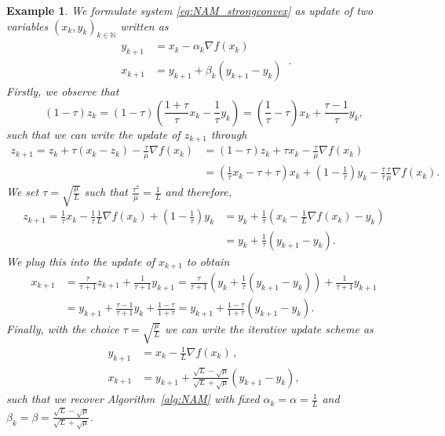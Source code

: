\documentclass[12pt,openany]{book}
\newtheorem{example}[thm]{Example}
\theoremstyle{definition}
\theoremstyle{definition}
\newcommand{\N}{\mathbb{N}}
\begin{document}
\begin{example}
We formulate system \eqref{eq:NAM_strongconvex} as update of two variables $(x_k,y_k)_{k\in\N}$ written as
\begin{equation*}
\begin{split}
y_{k+1} &= x_k - \alpha_k\nabla f(x_k)\\
x_{k+1} &= y_{k+1} + \beta_k (y_{k+1}-y_k)
\end{split}\, .
\end{equation*}
Firstly, we observe that
\[(1-\tau) z_k = (1-\tau)\left(\frac{1+\tau}{\tau} x_k -\frac{1}{\tau} y_k \right) = \left(\frac{1}{\tau}-\tau\right) x_k + \frac{\tau-1}{\tau}y_k, \]
such that we can write the update of $z_{k+1}$ through
\begin{align*}
z_{k+1} = z_k + \tau (x_k-z_k) - \frac{\tau}{\mu} \nabla f(x_k)
&=(1-\tau) z_k + \tau x_k-\frac{\tau}{\mu} \nabla f(x_k)\\
&=\left(\frac{1}{\tau} x_k -\tau+\tau\right) x_k +\left(1-\frac{1}{\tau}\right)y_k - \frac{\tau}{\tau}\frac{\tau}{\mu}\nabla f(x_k).
\end{align*}
We set $\tau = \sqrt{\frac{\mu}{L}}$ such that $\frac{\tau^2}{\mu} = \frac{1}L$ and therefore,
\begin{align*}
z_{k+1} = \frac1\tau x_k - \frac1\tau \frac1L\nabla f(x_k) + \left(1-\frac1\tau\right)y_k &= y_k + \frac1\tau \left(x_k-\frac1L\nabla f(x_k) -y_k \right)\\
&= y_k + \frac1\tau (y_{k+1}-y_k).
\end{align*}
We plug this into the update of $x_{k+1}$ to obtain
\begin{align*}
x_{k+1} &= \frac{\tau}{\tau+1}z_{k+1} +\frac{1}{\tau+1} y_{k+1} = \frac{\tau}{\tau+1} \left(y_k+\frac1\tau (y_{k+1}-y_k)\right) + \frac1{\tau+1} y_{k+1}\\
&=y_{k+1} + \frac{\tau-1}{\tau+1} y_k + \frac{1-\tau}{1+\tau}= y_{k+1} + \frac{1-\tau}{1+\tau} (y_{k+1}-y_k).
\end{align*}
Finally, with the choice $\tau = \sqrt{\frac{\mu}{L}}$ we can write the iterative update scheme as
\begin{align*}
y_{k+1} &= x_k - \frac1L \nabla f(x_k)\,,\\
x_{k+1} &=  y_{k+1} + \frac{\sqrt{L}-\sqrt{\mu}}{\sqrt{L}+\sqrt{\mu}} (y_{k+1}-y_k),
\end{align*}
such that we recover Algorithm~\ref{alg:NAM} with fixed $\alpha_k=\alpha = \frac{1}{L}$ and $\beta_k = \beta = \frac{\sqrt{L}-\sqrt{\mu}}{\sqrt{L}+\sqrt{\mu}}$.
\end{example}
\end{document}
